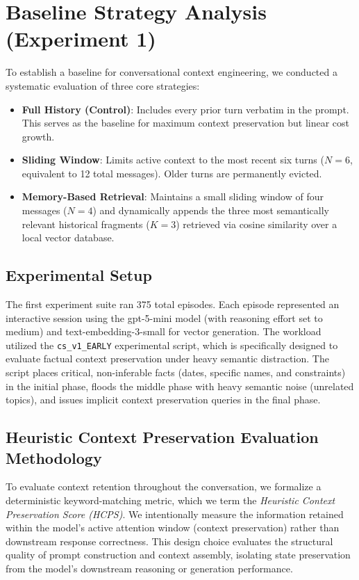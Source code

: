 \documentclass[11pt,journal,onecolumn]{article}
\begin{document}
\section{Baseline Strategy Analysis (Experiment 1)}
To establish a baseline for conversational context engineering, we conducted a systematic evaluation of three core strategies:
\begin{itemize}
    \item \textbf{Full History (Control)}: Includes every prior turn verbatim in the prompt. This serves as the baseline for maximum context preservation but linear cost growth.
    \item \textbf{Sliding Window}: Limits active context to the most recent six turns ($N=6$, equivalent to 12 total messages). Older turns are permanently evicted.
    \item \textbf{Memory-Based Retrieval}: Maintains a small sliding window of four messages ($N=4$) and dynamically appends the three most semantically relevant historical fragments ($K=3$) retrieved via cosine similarity over a local vector database.
\end{itemize}

\subsection{Experimental Setup}
The first experiment suite ran 375 total episodes. Each episode represented an interactive session using the gpt-5-mini model (with reasoning effort set to medium) and text-embedding-3-small for vector generation. The workload utilized the \texttt{cs\_v1\_EARLY} experimental script, which is specifically designed to evaluate factual context preservation under heavy semantic distraction. The script places critical, non-inferable facts (dates, specific names, and constraints) in the initial phase, floods the middle phase with heavy semantic noise (unrelated topics), and issues implicit context preservation queries in the final phase.

\subsection{Heuristic Context Preservation Evaluation Methodology}
To evaluate context retention throughout the conversation, we formalize a deterministic keyword-matching metric, which we term the \textit{Heuristic Context Preservation Score (HCPS)}. We intentionally measure the information retained within the model's active attention window (context preservation) rather than downstream response correctness. This design choice evaluates the structural quality of prompt construction and context assembly, isolating state preservation from the model's downstream reasoning or generation performance.
\end{document}
